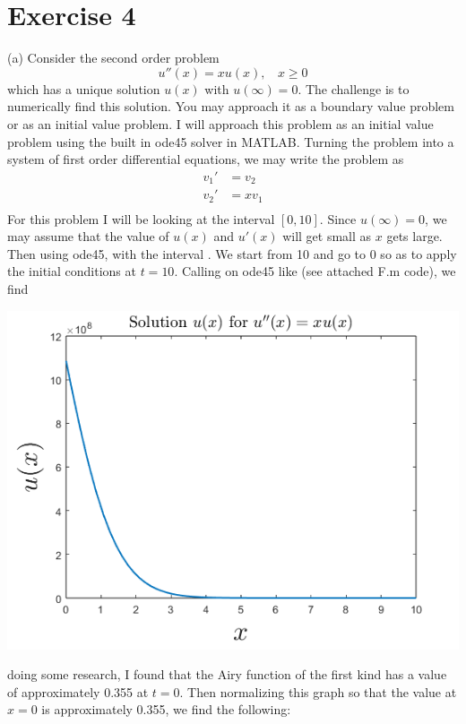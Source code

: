 \documentclass{article}
\begin{document}
\section*{Exercise 4}
(a) Consider the second order problem
\[u''(x) = xu(x), \:\:\:\: x \geq 0\]
which has a unique solution $u(x)$ with $u(\infty) = 0$. The challenge is to numerically find this solution. You may approach it as a boundary value problem or as an initial value problem. 
\newline\newline
I will approach this problem as an initial value problem using the built in ode45 solver in MATLAB. Turning the problem into a system of first order differential equations, we may write the problem as
\begin{align*}
    v_1' &= v_2 \\
    v_2' &= xv_1 \\
\end{align*}
For this problem I will be looking at the interval $[0,10]$. Since $u(\infty) = 0$, we may assume that the value of $u(x)$ and $u'(x)$ will get small as $x$ gets large. Then using ode45, with the interval . We start from 10 and go to 0 so as to apply the initial conditions at $t = 10$. Calling on ode45 like  (see attached F.m code), we find
\begin{center}
    \includegraphics[scale = 0.6]{prob4plot1.png}
\end{center}
doing some research, I found that the Airy function of the first kind has a value of approximately 0.355 at $t = 0$. Then normalizing this graph so that the value at $x = 0$ is approximately 0.355, we find the following:
\end{document}
